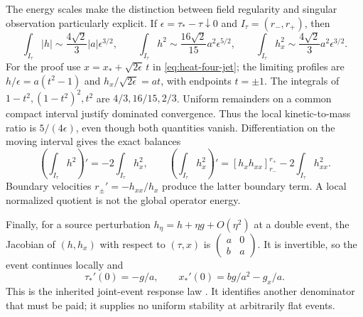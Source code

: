 The energy scales make the distinction between field regularity and
singular observation particularly explicit. If
\(\epsilon=\tau_*-\tau\downarrow0\) and \(I_\tau=(r_-,r_+)\), then
\begin{equation}\label{eq:local-lobe-scales}
 \int_{I_\tau}|h|\sim\frac{4\sqrt2}{3}|a|\epsilon^{3/2},\qquad
 \int_{I_\tau}h^2\sim\frac{16\sqrt2}{15}a^2\epsilon^{5/2},\qquad
 \int_{I_\tau}h_x^2\sim\frac{4\sqrt2}{3}a^2\epsilon^{3/2}.
\end{equation}
For the proof use \(x=x_*+\sqrt{2\epsilon}\,t\) in
\eqref{eq:heat-four-jet}; the limiting profiles are
\(h/\epsilon=a(t^2-1)\) and \(h_x/\sqrt{2\epsilon}=at\), with endpoints
\(t=\pm1\). The integrals of \(1-t^2,(1-t^2)^2,t^2\) are
\(4/3,16/15,2/3\). Uniform remainders on a common compact interval
justify dominated convergence. Thus the local kinetic-to-mass ratio is
\(5/(4\epsilon)\), even though both quantities vanish.
Differentiation on the moving interval gives the exact balances
\[
 \left(\int_{I_\tau}h^2\right)'=-2\int_{I_\tau}h_x^2,\qquad
 \left(\int_{I_\tau}h_x^2\right)'
 =[h_xh_{xx}]_{r_-}^{r_+}-2\int_{I_\tau}h_{xx}^2.
\]
Boundary velocities \(r_\pm'=-h_{xx}/h_x\) produce the latter boundary
term. A local normalized quotient is not the global operator energy.

Finally, for a source perturbation \(h_\eta=h+\eta g+O(\eta^2)\)
at a double event, the Jacobian of \((h,h_x)\) with respect to
\((\tau,x)\) is \(\left(\begin{smallmatrix}a&0\\b&a\end{smallmatrix}\right)\).
It is invertible, so the event continues locally and
\[
 \tau_*'(0)=-g/a,\qquad x_*'(0)=bg/a^2-g_x/a.
\]
This is the inherited joint-event response law \cite{SourceResponse}.
It identifies another denominator that must be paid; it supplies no
uniform stability at arbitrarily flat events.

